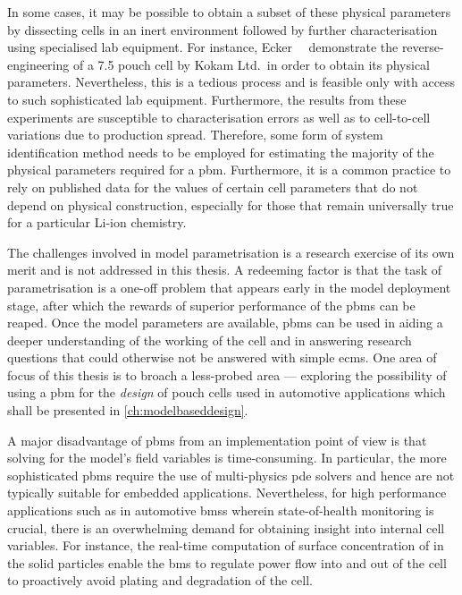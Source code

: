 In  some  cases, it  may  be  possible to  obtain  a  subset of  these  physical
parameters   by  dissecting   cells  in   an  inert   environment  followed   by
further  characterisation   using  specialised  lab  equipment.   For  instance,
Ecker~\etal~\cite{Ecker2015}   demonstrate   the    reverse-engineering   of   a
\SI{7.5}{\amphour} pouch  cell by Kokam  Ltd.\ in  order to obtain  its physical
parameters. Nevertheless,  this is a tedious  process and is feasible  only with
access  to  such sophisticated  lab  equipment.  Furthermore, the  results  from
these  experiments are  susceptible to  characterisation  errors as  well as  to
cell-to-cell variations due to production spread. Therefore, some form of system
identification method  needs to be employed  for estimating the majority  of the
physical  parameters required  for  a  \gls{pbm}. Furthermore,  it  is a  common
practice to  rely on published  data for the  values of certain  cell parameters
that do  not depend on physical  construction, especially for those  that remain
universally true for a particular Li-ion chemistry.

The challenges involved  in model parametrisation is a research  exercise of its
own merit and  is not addressed in  this thesis. A redeeming factor  is that the
task of  parametrisation is a  one-off problem that  appears early in  the model
deployment  stage,  after which  the  rewards  of  superior performance  of  the
\glspl{pbm} can be reaped. Once  the model parameters are available, \glspl{pbm}
can be used in  aiding a deeper understanding of the working of  the cell and in
answering research  questions that could  otherwise not be answered  with simple
\glspl{ecm}. One area  of focus of this  thesis is to broach  a less-probed area
--- exploring  the possibility  of using  a \gls{pbm}  for the  \emph{design} of
pouch  cells  used  in  automotive  applications which  shall  be  presented  in
\cref{ch:modelbaseddesign}.

A major disadvantage of \glspl{pbm} from an implementation point of view is that
solving for  the model's field  variables is time-consuming. In  particular, the
more  sophisticated  \glspl{pbm}  require  the use  of  multi-physics  \gls{pde}
solvers  and  hence  are  not  typically  suitable  for  embedded  applications.
Nevertheless,  for   high  performance   applications  such  as   in  automotive
\glspl{bms}  wherein   state-of-health  monitoring  is  crucial,   there  is  an
overwhelming  demand for  obtaining insight  into internal  cell variables.  For
instance, the real-time computation of surface concentration of  in the
solid particles enable the \gls{bms} to regulate  power flow into and out of the
cell to proactively avoid plating and degradation of the cell.


